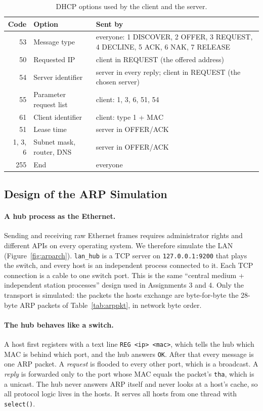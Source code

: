 \documentclass[11pt]{article}
\begin{document}
\begin{table}[H]
\centering
\small
\begin{tabular}{rlp{8.6cm}}
\toprule
\textbf{Code} & \textbf{Option} & \textbf{Sent by} \\
\midrule
53  & Message type & everyone: 1 DISCOVER, 2 OFFER, 3 REQUEST, 4 DECLINE, 5 ACK, 6 NAK,
                     7 RELEASE \\
50  & Requested IP & client in REQUEST (the offered address) \\
54  & Server identifier & server in every reply; client in REQUEST (the chosen server) \\
55  & Parameter request list & client: 1, 3, 6, 51, 54 \\
61  & Client identifier & client: type 1 + MAC \\
51  & Lease time & server in OFFER/ACK \\
1, 3, 6 & Subnet mask, router, DNS & server in OFFER/ACK \\
255 & End & everyone \\
\bottomrule
\end{tabular}
\caption{DHCP options used by the client and the server.}
\label{tab:options}
\end{table}

\subsection{Design of the ARP Simulation}
\paragraph{A hub process as the Ethernet.} Sending and receiving raw Ethernet frames
requires administrator rights and different APIs on every operating system. We therefore
simulate the LAN (Figure~\ref{fig:arparch}). \texttt{lan\_hub} is a TCP server on
\texttt{127.0.0.1:9200} that plays the switch, and every host is an independent process
connected to it. Each TCP connection is a cable to one switch port. This is the same
``central medium + independent station processes'' design used in Assignments 3 and 4.
Only the transport is simulated: the packets the hosts exchange are byte-for-byte the
28-byte ARP packets of Table~\ref{tab:arppkt}, in network byte order.

\paragraph{The hub behaves like a switch.} A host first registers with a text line
\texttt{REG <ip> <mac>}, which tells the hub which MAC is behind which port, and the hub
answers \texttt{OK}. After that every message is one ARP packet. A \emph{request} is
flooded to every other port, which is a broadcast. A \emph{reply} is forwarded only to the
port whose MAC equals the packet's \texttt{tha}, which is a unicast. The hub never answers
ARP itself and never looks at a host's cache, so all protocol logic lives in the hosts.
It serves all hosts from one thread with \texttt{select()}.
\end{document}
